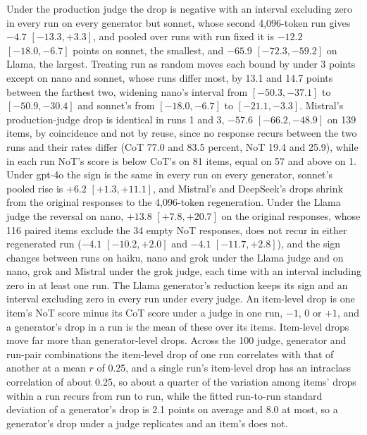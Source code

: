 Under the production judge the drop is negative with an interval excluding
zero in every run on every generator but sonnet, whose second 4,096-token
run gives $-4.7$ $[-13.3, +3.3]$, and pooled over runs with run fixed it is
$-12.2$ $[-18.0, -6.7]$ points on sonnet, the smallest, and $-65.9$
$[-72.3, -59.2]$ on Llama, the largest. Treating run as random moves each
bound by under 3 points except on nano and sonnet, whose runs differ most,
by 13.1 and 14.7 points between the farthest two, widening nano's interval
from $[-50.3, -37.1]$ to $[-50.9, -30.4]$ and sonnet's from $[-18.0, -6.7]$
to $[-21.1, -3.3]$. Mistral's production-judge drop is identical in runs 1
and 3, $-57.6$ $[-66.2, -48.9]$ on 139 items, by coincidence and not by
reuse, since no response recurs between the two runs and their rates differ
(CoT 77.0 and 83.5 percent, NoT 19.4 and 25.9), while in each run NoT's
score is below CoT's on 81 items, equal on 57 and above on 1.
Under gpt-4o the sign is the same in every run on every generator, sonnet's
pooled rise is $+6.2$ $[+1.3, +11.1]$, and Mistral's and DeepSeek's drops
shrink from the original responses to the 4,096-token regeneration.
Under the Llama judge the reversal on nano, $+13.8$ $[+7.8, +20.7]$ on the
original responses, whose 116 paired items exclude the 34 empty NoT
responses, does not recur in either regenerated run ($-4.1$ $[-10.2, +2.0]$ and
$-4.1$ $[-11.7, +2.8]$), and the sign changes between runs on haiku, nano and
grok under the Llama judge and on nano, grok and Mistral under the grok
judge, each time with an interval including zero in at least one run.
The Llama generator's reduction keeps its sign and an interval excluding zero
in every run under every judge.
An item-level drop is one item's NoT score minus its CoT score under a judge
in one run, $-1$, 0 or $+1$, and a generator's drop in a run is the mean of
these over its items.
Item-level drops move far more than generator-level drops. Across the 100
judge, generator and run-pair combinations the item-level drop of one run
correlates with that of another at a mean $r$ of 0.25, and a single run's
item-level drop has an intraclass correlation of about 0.25, so about a
quarter of the variation among items' drops within a run recurs from run to
run, while the fitted run-to-run standard deviation of a generator's drop is
2.1 points on average and 8.0 at most, so a generator's drop under a judge
replicates and an item's does not.


